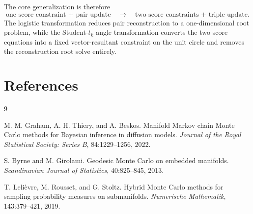 \documentclass[11pt]{article}
\newcommand{\1}{\mathbf{1}}
\begin{document}
The core generalization is therefore
\[
\boxed{
\text{one score constraint + pair update}
\quad\longrightarrow\quad
\text{two score constraints + triple update}.
}
\]
The logistic transformation reduces pair reconstruction to a one-dimensional root problem, while the Student-$t_k$ angle transformation converts the two score equations into a fixed vector-resultant constraint on the unit circle and removes the reconstruction root solve entirely.

\section*{References}

\begin{thebibliography}{9}

M. M. Graham, A. H. Thiery, and A. Beskos.
\newblock Manifold Markov chain Monte Carlo methods for Bayesian inference in diffusion models.
\newblock \emph{Journal of the Royal Statistical Society: Series B}, 84:1229--1256, 2022.

S. Byrne and M. Girolami.
\newblock Geodesic Monte Carlo on embedded manifolds.
\newblock \emph{Scandinavian Journal of Statistics}, 40:825--845, 2013.

T. Leli\`evre, M. Rousset, and G. Stoltz.
\newblock Hybrid Monte Carlo methods for sampling probability measures on submanifolds.
\newblock \emph{Numerische Mathematik}, 143:379--421, 2019.

\end{thebibliography}
\end{document}
